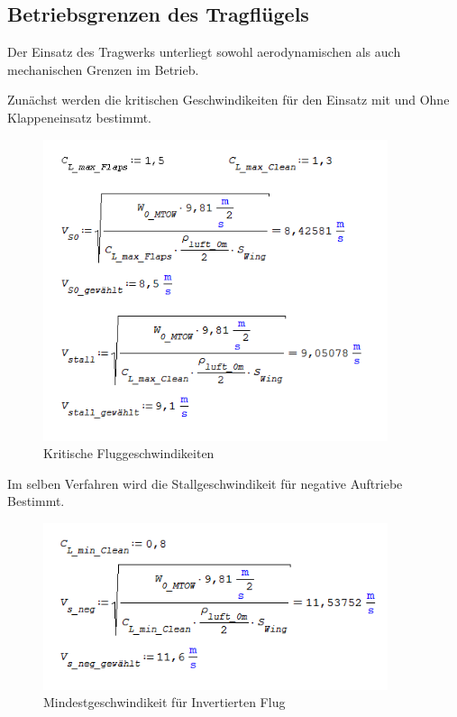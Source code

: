


\subsection{Betriebsgrenzen des Tragflügels}

Der Einsatz des Tragwerks unterliegt sowohl aerodynamischen als auch mechanischen Grenzen im Betrieb.

Zunächst werden die kritischen Geschwindikeiten für den Einsatz mit und Ohne Klappeneinsatz bestimmt.

\begin{figure}[H]
\centering
\includegraphics[width=0.9\textwidth]{bilder/Formeln/Mindestbetriebsgeschwindikeit.png}
\caption{Kritische Fluggeschwindikeiten} 
\label{fig:Kritische Fluggeschwindikeiten}
\end{figure}

Im selben Verfahren wird die Stallgeschwindikeit für negative Auftriebe Bestimmt.

\begin{figure}[H]
\centering
\includegraphics[width=0.9\textwidth]{bilder/Formeln/VS_neg.png}
\caption{Mindestgeschwindikeit für Invertierten Flug} 
\label{fig:Mindestgeschwindikeit für Invertierten Flug}
\end{figure}

